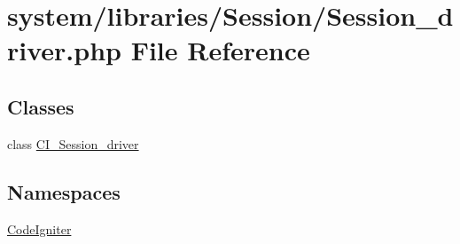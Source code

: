 \hypertarget{_session__driver_8php}{}\section{system/libraries/\+Session/\+Session\+\_\+driver.php File Reference}
\label{_session__driver_8php}
\subsection*{Classes}
\begin{DoxyCompactItemize}
\item 
class \mbox{\hyperlink{class_c_i___session__driver}{C\+I\+\_\+\+Session\+\_\+driver}}
\end{DoxyCompactItemize}
\subsection*{Namespaces}
\begin{DoxyCompactItemize}
\item 
 \mbox{\hyperlink{namespace_code_igniter}{Code\+Igniter}}
\end{DoxyCompactItemize}
